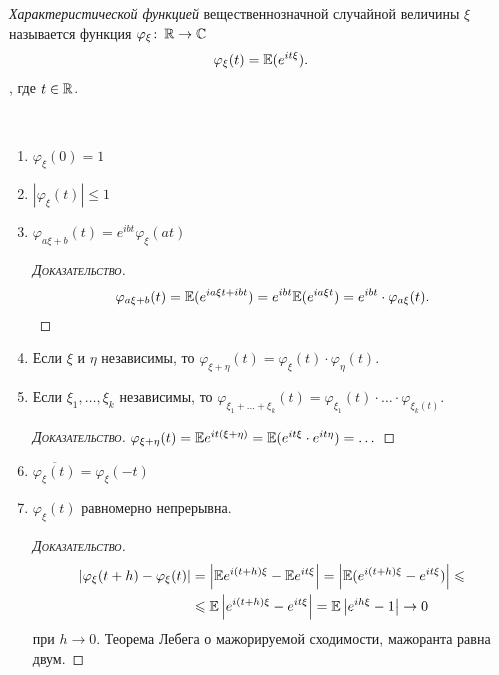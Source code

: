 \documentclass[../main.tex]{subfiles}
\begin{document}
\begin{df}
 \textit{Характеристической функцией} вещественнозначной случайной величины $ \xi $ называется функция $ \varphi_\xi \colon\, \mathbb{R} \to \mathbb{C} $
 \begin{align*}
  \varphi_\xi(t) = \mathbb E ( e^{it\xi} ).
 \end{align*}, где $ t \in \mathbb{R} $.
\end{df}
\begin{prop}\
 \begin{enumerate}
  \item $ \varphi_{\xi}(0) = 1 $
  \item $ \left|\varphi_\xi(t) \right| \leqslant 1 $
  \item $ \varphi_{a\xi + b}(t) = e^{ibt}\varphi_\xi(at) $
   \begin{proof}[\normalfont\textsc{Доказательство}]
    \begin{align*}
     \varphi_{a\xi+b}(t) = \mathbb E (e^{ia\xi t + ibt}) = e^{ibt} \mathbb E(e^{ia\xi t}) = e^{ibt} \cdot \varphi_{a\xi}(t).
    \end{align*}
   \end{proof}
  \item Если $ \xi $ и $ \eta $ независимы, то $ \varphi_{\xi + \eta}(t) = \varphi_\xi(t) \cdot \varphi_\eta(t) $.
  \item Если $ \xi_1, \ldots, \xi_k $ независимы, то $ \varphi_{\xi_1 + \ldots + \xi_k}(t) = \varphi_{\xi_1}(t) \cdot \ldots \cdot \varphi_{\xi_k(t)} $.
   \begin{proof}[\normalfont\textsc{Доказательство}]
    $ \varphi_{\xi+\eta}(t) = \mathbb E e^{it(\xi + \eta)} = \mathbb E (e^{it\xi} \cdot e^{it\eta}) = \ldots$ 
   \end{proof}
  \item $ \overline{\varphi_\xi(t)} = \varphi_\xi(-t) $
  \item $ \varphi_\xi(t) $ равномерно непрерывна.
   \begin{proof}[\normalfont\textsc{Доказательство}]
    \begin{align*}
     \left| \varphi_\xi(t + h) - \varphi_\xi(t) \right| &= \left|\mathbb E e^{i(t+h)\xi} - \mathbb E e^{it\xi} \right| = \left| \mathbb E (e^{i(t+h)\xi} - e^{it\xi}) \right| \leqslant \\
     &\leqslant \mathbb E \left| e^{i(t+h)\xi} - e^{it\xi} \right| = \mathbb E \left| e^{ih\xi} - 1 \right| \to 0
    \end{align*} при $ h \to 0 $. Теорема Лебега о мажорируемой сходимости, мажоранта равна двум.
   \end{proof}
 \end{enumerate}
\end{prop}
\end{document}

